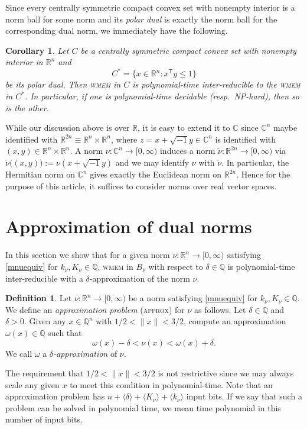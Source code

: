 \documentclass[11pt,reqno]{amsart}
\newtheorem{corollary}[theorem]{Corollary}
\theoremstyle{definition}
\newtheorem{definition}[theorem]{Definition}
\theoremstyle{remark}
\begin{document}
Since every centrally symmetric compact convex set with nonempty interior is a norm ball for some norm and its \emph{polar dual} is exactly the norm ball for the corresponding dual norm, we immediately have the following.
\begin{corollary}\label{cor:cscc}
Let $C$ be a  centrally symmetric compact convex set with nonempty interior in $\mathbb{R}^n$ and
\[
C^* = \{ x \in \mathbb{R}^n : x^\mathsf{T} y \le 1 \}
\]
be its polar dual. Then \textsc{wmem} in $C$ is polynomial-time inter-reducible to the \textsc{wmem} in $C^*$. In particular, if one is polynomial-time decidable  (resp.\ NP-hard), then so is the other.
\end{corollary}

While our discussion above is over $\mathbb{R}$, it is easy to extend it to $\mathbb{C}$ since $\mathbb{C}^{n}$ maybe identified with $\mathbb{R}^{2n}\equiv \mathbb{R}^{n}\times \mathbb{R}^{n}$, where $z = x+\sqrt{-1}y\in \mathbb{C}^n$ is identified with $(x,y)\in\mathbb{R}^{n}\times \mathbb{R}^{n}$.  
A norm $\nu:\mathbb{C}^n\to [0,\infty)$ induces a norm $\tilde \nu:\mathbb{R}^{2n}\to [0,\infty)$ via
$\tilde \nu\bigl((x,y)\bigr):=\nu(x+\sqrt{-1}y)$ and we may identify $\nu$ with $\tilde \nu$.  In particular, the Hermitian norm on $\mathbb{C}^n$ 
gives exactly the Euclidean norm on $\mathbb{R}^{2n}$.  Hence for the purpose of this article, it suffices to consider norms over real vector spaces.
 
\section{Approximation of dual norms}\label{sec:approx}

In this section we  show that for a given norm $\nu:\mathbb{R}^n \to [0,\infty)$ satisfying 
\eqref{mnuequiv} for $k_\nu, K_\nu \in \mathbb{Q}$, \textsc{wmem} in $B_\nu$ with respect to  $\delta \in \mathbb{Q}$ is polynomial-time inter-reducible with a $\delta$-approximation of the norm $\nu$.

\begin{definition}\label{def:approx}
Let  $\nu:\mathbb{R}^n \to [0,\infty)$ be a norm satisfying 
\eqref{mnuequiv} for $k_\nu, K_\nu \in \mathbb{Q}$.
We define an \emph{approximation problem} (\textsc{approx}) for $\nu$ as follows.
Let $\delta \in \mathbb{Q}$ and $\delta > 0$.  Given any $x\in \mathbb{Q}^n$ with $1/2 < \|x\| < 3/2$, compute an approximation $\omega(x) \in \mathbb{Q}$ such that
\begin{equation}\label{approxnu}
\omega(x) -\delta<\nu(x)<\omega(x) +\delta.
\end{equation}
We call $\omega$ a \emph{$\delta$-approximation} of $\nu$.
\end{definition}
The requirement that $1/2 < \|x\| < 3/2$ is not restrictive since we may always scale any given $x$ to meet this condition in polynomial-time. Note that an approximation problem has $n+\langle \delta \rangle+\langle K_\nu \rangle+\langle k_\nu \rangle $ input bits. If we say that such  a problem can be solved in polynomial time, we mean time polynomial in this number of input bits.
\end{document}
